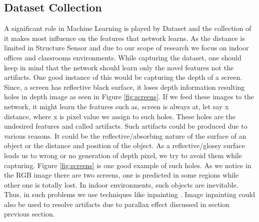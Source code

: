 \subsection{Dataset Collection}

A significant role in Machine Learning is played by Dataset and the collection of it makes most influence on the features that network learns. As the distance is limited in Structure Sensor and due to our scope of research we focus on indoor offices and classrooms environments. While capturing the dataset, one should keep in mind that the network should learn only the novel features not the artifacts. One good instance of this would be capturing the depth of a screen. Since, a screen has reflective black surface, it loses depth information resulting holes in depth image as seen in Figure \ref{fig:screens}. If we feed these images to the network, it might learn the features such as, screen is always at, let say x distance, where x is pixel value we assign to such holes. These holes are the undesired features and called artifacts. Such artifacts could be produced due to various reasons. It could be the reflective/absorbing nature of the surface of an object or the distance and position of the object\cite{geomar41830}. As a reflective/glossy surface leads us to wrong or no generation of depth pixel, we try to avoid them while capturing. Figure \ref{fig:screens} is one good example of such holes. As we notice in the RGB image there are two screens, one is predicted in some regions while other one is totally lost. In indoor environments, such objects are inevitable. Thus, in such problems we use techniques like inpainting \cite{inpainting}. Image inpainting could also be used to resolve artifacts due to parallax effect discussed in section previous section.\\
